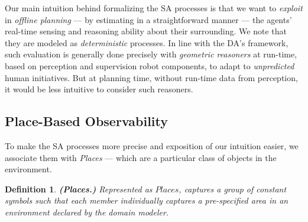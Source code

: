 \documentclass[letterpaper]{article} %
\newtheorem{definition}{Definition}
\begin{document}
Our main intuition behind formalizing the SA processes is that we want to \textit{exploit} in \textit{offline planning} --- by estimating in a straightforward manner --- the agents' real-time sensing and reasoning ability about their surrounding. We note that they are modeled as \textit{deterministic} processes. 
In line with the DA's framework, such evaluation is generally done precisely with \textit{geometric reasoners} at run-time, based on perception and supervision robot components, to adapt to \textit{unpredicted} human initiatives. But at planning time, without run-time data from perception, it would be less intuitive to consider such reasoners. 

\subsection{Place-Based Observability}





To make the SA processes more precise and exposition of our intuition easier, we associate them with  \textit{Places} --- which are a particular class of objects in the environment. 

\begin{definition} \label{def:places}
\textbf{(Places.)} Represented as $\mathit{Places}$, captures a group of constant symbols such that each member individually captures a pre-specified area in an environment declared by the domain modeler.  
\end{definition}
\end{document}
